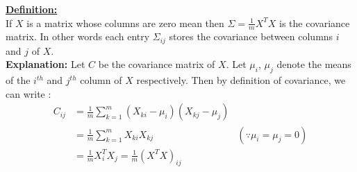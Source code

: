 \begin{frame}
  \begin{overlayarea}{\textwidth}{\textheight}
    {\underline{\textbf{Definition:}}\\
    If $X$ is a matrix whose columns are zero mean then $\Sigma =  \frac{1}{m} X^T X$ is the covariance matrix. In other words each entry $\Sigma_{ij}$ stores the covariance between columns $i$ and $j$ of $X$.
    }\\
    {\textbf{Explanation:} Let $C$ be the covariance matrix of $X$. Let $\mu_{i}$, $\mu_{j}$ denote the means of the $i^{th}$ and $j^{th}$ column of $X$ respectively. Then by definition of covariance, we can write :
      \begin{align*}
          C_{ij} &= \frac{1}{m} \sum_{k=1}^{m} (X_{ki} - \mu_{i})(X_{kj} - \mu_{j}) \\
                 &= \frac{1}{m} \sum_{k=1}^m X_{ki} X_{kj} &(\because \mu_i = \mu_j = 0)\\
                 &= \frac{1}{m} X^{T}_{i} X_{j} = \frac{1}{m} (X^{T} X)_{ij}
      \end{align*}
    } 
  \end{overlayarea}
\end{frame}
